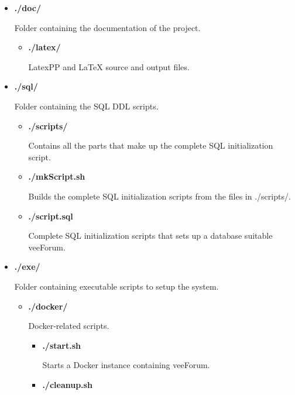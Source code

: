 \documentclass[12pt]{report}
\renewcommand\emph{\textbf}
\begin{document}
            \begin{itemize}
                \item \emph{./doc/}

                    Folder containing the documentation of the project.
                    \begin{itemize}
                        \item \emph{./latex/}

                        LatexPP and \LaTeX{}  source and output files.
                    \end{itemize}

                \item \emph{./sql/}

                    Folder containing the SQL DDL scripts.
                    \begin{itemize}
                        \item \emph{./scripts/}

                        Contains all the parts that make up the complete SQL initialization script.

                        \item \emph{./mkScript.sh}

                        Builds the complete SQL initialization scripts from the files in ./scripts/.

                        \item \emph{./script.sql}

                        Complete SQL initialization scripts that sets up a database suitable veeForum.
                    \end{itemize}

                \item \emph{./exe/}

                    Folder containing executable scripts to setup the system.
                    \begin{itemize}
                        \item \emph{./docker/}

                        Docker-related scripts.
                        \begin{itemize}
                            \item \emph{./start.sh}

                            Starts a Docker instance containing veeForum.

                            \item \emph{./cleanup.sh}


\end{itemize}
\end{itemize}
\end{itemize}
\end{document}
